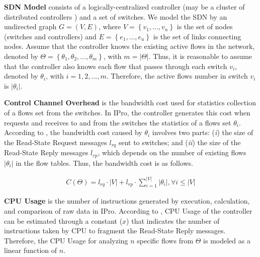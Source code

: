 \textbf{SDN Model} consists of a logically-centralized controller (may be a cluster of distributed controllers \cite{jose_2011:online_measurement} \cite{tahaei_2018:distributed_controller}) and a set of switches. We model the SDN by an undirected graph $G=(V,E)$, where $V=\left \{ v_1,..., v_n \right \}$ is the set of nodes (switches and controllers) and $E=\left \{ e_1,..., e_u \right \}$ is the set of links connecting nodes. Assume that the controller knows the existing active flows in the network, denoted by $\Theta = \left \{ \theta_1, \theta_2, ..., \theta_m \right \} $, with $m=\left | \Theta  \right |$. Thus, it is reasonable to assume that the controller also knows each flow that passes through each switch $v_i$, denoted by $\theta_i$, with $i=1,2,...,m$. Therefore, the active flows number in switch $v_i$ is $\left | \theta_i  \right |$.

\textbf{Control Channel Overhead} is the bandwidth cost used for statistics collection of a flows set from the switches. In IPro, the controller generates this cost when requests and receives to and from the switches the statistics of a flows set $\theta_i$. According to \cite{onf_2012:openflow}\cite{su_2015:cemon}, the bandwidth cost caused by $\theta_i$ involves two parts: (\textit{i}) the size of the Read-State Request messages $l_{rq}$ sent to switches; and (\textit{ii}) the size of the Read-State Reply messages  $l_{rp}$, which depends on the number of existing flows $\left | \theta_i  \right |$ in the flow tables. Thus, the bandwidth cost is as follows.

\begin{equation}
    \begin{split}
        C\left ( \Theta  \right ) = l_{rq} \cdot \left | V \right | + l_{rp} \cdot \sum_{i=1}^{\left | V \right |} \left | \theta_i \right |, \forall i \leqslant \left | V \right |
    \end{split}
     \label{equ:load}
\end{equation}

\textbf{CPU Usage} is the number of instructions generated by execution, calculation, and comparison of raw data in IPro. According to \cite{tahaei_2018:distributed_controller}, 
CPU Usage of the controller can be estimated through a constant ($x$) that indicates the number of instructions taken by CPU to fragment the Read-State Reply messages. Therefore, the CPU Usage for analyzing $n$ specific flows from $\Theta$ is modeled as a linear function of $n$.

